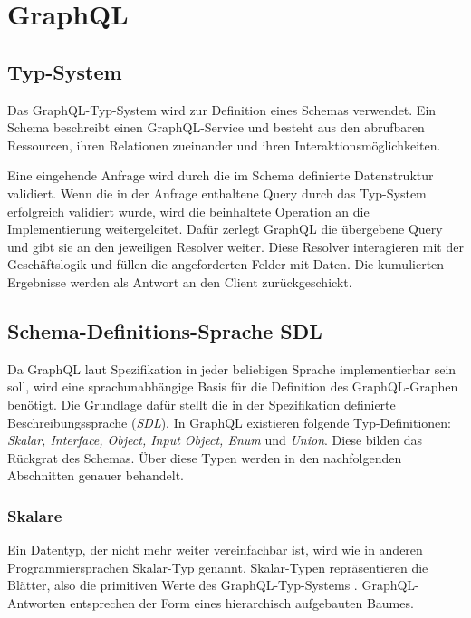\chapter{GraphQL}
\section{Typ-System}

Das GraphQL-Typ-System wird zur Definition eines Schemas verwendet.
Ein Schema beschreibt einen GraphQL-Service und besteht aus den abrufbaren Ressourcen, ihren Relationen zueinander und ihren Interaktionsmöglichkeiten.


Eine eingehende Anfrage wird durch die im Schema definierte Datenstruktur validiert.
Wenn die in der Anfrage enthaltene Query durch das Typ-System erfolgreich validiert wurde, wird die beinhaltete Operation an die Implementierung weitergeleitet.
Dafür zerlegt GraphQL die übergebene Query und gibt sie an den jeweiligen Resolver weiter. Diese Resolver interagieren mit der Geschäftslogik und füllen die angeforderten Felder mit Daten.
Die kumulierten Ergebnisse werden als Antwort an den Client zurückgeschickt. 
\cite[S. 57-58]{kress2020graphql}
\cite[Abs. Schemadefinition]{graphqlOnline}


\section{Schema-Definitions-Sprache SDL}
Da GraphQL laut Spezifikation in jeder beliebigen Sprache implementierbar sein soll, wird eine sprachunabhängige Basis für die Definition des GraphQL-Graphen benötigt.
Die Grundlage dafür stellt die in der Spezifikation definierte Beschreibungssprache (\textit{SDL}). 
In GraphQL existieren folgende Typ-Definitionen: \textit{Skalar, Interface, Object, Input Object, Enum} und \textit{Union}.
Diese bilden das Rückgrat des Schemas.
Über diese Typen werden in den nachfolgenden Abschnitten genauer behandelt.

\subsection{Skalare}

Ein Datentyp, der nicht mehr weiter vereinfachbar ist, wird wie in anderen Programmiersprachen Skalar-Typ genannt.
Skalar-Typen repräsentieren die Blätter, also die primitiven Werte des GraphQL-Typ-Systems \cite[S. 60]{kress2020graphql}.
GraphQL-Antworten entsprechen der Form eines hierarchisch aufgebauten Baumes.
\newline


